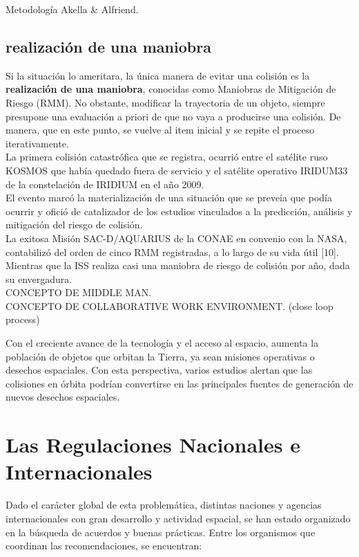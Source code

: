 {Metodolog\'ia Akella \& Alfriend.\\

\subsection*{realizaci\'on de una maniobra}
Si la situaci\'on lo ameritara, la \'unica manera de evitar una colisi\'on es la {\bf{realizaci\'on de una maniobra}}, conocidas como Maniobras de Mitigaci\'on de Riesgo (RMM). No obstante, modificar la trayectoria de un objeto, siempre presupone una evaluaci\'on a priori de que no vaya a producirse una colisi\'on. De manera, que en este punto, se vuelve al item inicial y se repite el proceso iterativamente.\\ 



La primera colisi\'on catastr\'ofica que se registra, ocurri\'o entre el sat\'elite ruso KOSMOS  que hab\'ia quedado fuera de servicio y el sat\'elite operativo IRIDUM33 de la constelaci\'on de IRIDIUM en el a\~no 2009.\\
El evento marc\'o la materializaci\'on de una situaci\'on que se preve\'ia que pod\'ia ocurrir y ofici\'o de catalizador de los estudios vinculados a la predicci\'on, an\'alisis y mitigaci\'on del riesgo de colisi\'on.\\
La exitosa Misi\'on SAC-D/AQUARIUS de la CONAE en convenio con la \ac{NASA}, contabiliz\'o del orden de cinco RMM registradas, a lo largo de su vida \'util [10]. Mientras que la \ac{ISS} realiza casi una maniobra de riesgo de colisi\'on por año, dada su envergadura.\\
CONCEPTO DE MIDDLE MAN.\\
CONCEPTO DE COLLABORATIVE WORK ENVIRONMENT. (close loop process)

Con el creciente avance de la tecnolog\'ia y el acceso al espacio, aumenta la poblaci\'on de objetos que orbitan la Tierra, ya sean  misiones operativas o desechos espaciales. Con esta perspectiva, varios estudios alertan que las colisiones en \'orbita podr\'ian convertirse en las principales fuentes de generaci\'on de nuevos desechos espaciales. \cite{KlinkradChapter8}\\

\section{Las Regulaciones Nacionales e Internacionales}

Dado el car\'acter global de esta problem\'atica, distintas naciones y agencias internacionales con gran desarrollo y actividad espacial, se han estado organizado en la b\'usqueda de acuerdos y buenas pr\'acticas. Entre los organismos que coordinan las recomendaciones, se encuentran:\\

}
